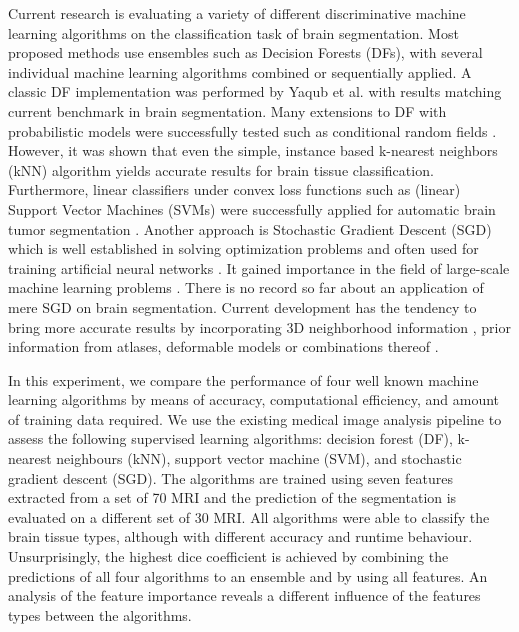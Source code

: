 \documentclass[journal]{IEEEtran}
\begin{document}
Current research is evaluating a variety of different discriminative machine learning algorithms on the classification task of brain segmentation. Most proposed methods use ensembles such as Decision Forests (DFs), with several individual machine learning algorithms combined or sequentially applied. A classic DF implementation was performed by Yaqub et al. \cite{Yaqub2014} with results matching current benchmark in brain segmentation. Many extensions to DF with probabilistic models were successfully tested such as conditional random fields \cite{Pereira2016}. However, it was shown that even the simple, instance based k-nearest neighbors (kNN) algorithm yields accurate results \cite{Anbeek2004,Cocosco2003,Warfield2000} for brain tissue classification. Furthermore, linear classifiers under convex loss functions such as (linear) Support Vector Machines (SVMs) were successfully applied for automatic brain tumor segmentation \cite{Bauer2011}. Another approach is Stochastic Gradient Descent (SGD) which is well established in solving optimization problems and often used for training artificial neural networks \cite{LeCun1998}. It gained importance in the field of large-scale machine learning problems \cite{Bottou2010}. There is no record so far about an application of mere SGD on brain segmentation. Current development has the tendency to bring more accurate results by incorporating 3D neighborhood information \cite{Li2011,Despotovic2013}, prior information from atlases\cite{Pohl2006,Ashburner2005}, deformable models \cite{Moreno2014} or combinations thereof \cite{Ortiz2014}.

In this experiment, we compare the performance of four well known machine learning algorithms by means of accuracy, computational efficiency, and amount of training data required. We use the existing medical image analysis pipeline to assess the following supervised learning algorithms: decision forest (DF), k-nearest neighbours (kNN), support vector machine (SVM), and stochastic gradient descent (SGD). The algorithms are trained using seven features extracted from a set of 70 MRI and the prediction of the segmentation is evaluated on a different set of 30 MRI. All algorithms were able to classify the brain tissue types, although with different accuracy and runtime behaviour. Unsurprisingly, the highest dice coefficient is achieved by combining the predictions of all four algorithms to an ensemble and by using all features. An analysis of the feature importance reveals a different influence of the features types between the algorithms.
\end{document}
